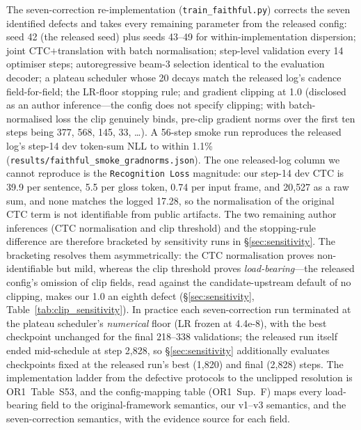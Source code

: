 \documentclass[pdflatex,sn-chicago]{sn-jnl}
\begin{document}
\noindent The seven-correction re-implementation (\texttt{train\_faithful.py}) corrects the seven identified defects and takes every remaining parameter from the released config: seed 42 (the released seed) plus seeds 43--49 for within-implementation dispersion; joint CTC$+$translation with batch normalisation; step-level validation every 14 optimiser steps; autoregressive beam-3 selection identical to the evaluation decoder; a plateau scheduler whose 20 decays match the released log's cadence field-for-field; the LR-floor stopping rule; and gradient clipping at 1.0 (disclosed as an author inference---the config does not specify clipping; with batch-normalised loss the clip genuinely binds, pre-clip gradient norms over the first ten steps being 377, 568, 145, 33, \ldots). A 56-step smoke run reproduces the released log's step-14 dev token-sum NLL to within 1.1\% (\texttt{results/faithful\_smoke\_gradnorms.json}). The one released-log column we cannot reproduce is the \texttt{Recognition Loss} magnitude: our step-14 dev CTC is 39.9 per sentence, 5.5 per gloss token, 0.74 per input frame, and 20{,}527 as a raw sum, and none matches the logged 17.28, so the normalisation of the original CTC term is not identifiable from public artifacts. The two remaining author inferences (CTC normalisation and clip threshold) and the stopping-rule difference are therefore bracketed by sensitivity runs in \S\ref{sec:sensitivity}. The bracketing resolves them asymmetrically: the CTC normalisation proves non-identifiable but mild, whereas the clip threshold proves \emph{load-bearing}---the released config's omission of clip fields, read against the candidate-upstream default of no clipping, makes our 1.0 an eighth defect (\S\ref{sec:sensitivity}, Table~\ref{tab:clip_sensitivity}). In practice each seven-correction run terminated at the plateau scheduler's \emph{numerical} floor (LR frozen at 4.4e-8), with the best checkpoint unchanged for the final 218--338 validations; the released run itself ended mid-schedule at step 2{,}828, so \S\ref{sec:sensitivity} additionally evaluates checkpoints fixed at the released run's best (1{,}820) and final (2{,}828) steps. The implementation ladder from the defective protocols to the unclipped resolution is OR1~Table~S53, and the config-mapping table (OR1~Sup.~F) maps every load-bearing field to the original-framework semantics, our v1--v3 semantics, and the seven-correction semantics, with the evidence source for each field.
\end{document}
